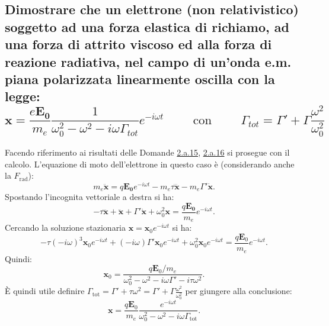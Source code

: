 \subsection[]{ Dimostrare che un elettrone (non relativistico) soggetto ad una forza elastica di richiamo, ad una forza di attrito viscoso ed alla forza di reazione radiativa, nel campo di un’onda e.m. piana polarizzata linearmente oscilla con la legge:
\[
	\boldsymbol{x} = \frac{e \boldsymbol{E_0}}{m_{e}} \frac{1}{\omega_0^2-\omega^2-i\omega\Gamma_{tot}} e^{-i \omega t} \quad \quad 
	\text{ con }  \quad \quad
	\Gamma_{tot} = \Gamma' + \Gamma \frac{\omega^2}{\omega_{0}^2}
\] 
} \label{subsec: 2.b.12}
Facendo riferimento ai risultati delle Domande \hyperref[subsec: 2.a.15]{2.a.15}, \hyperref[subsec: 2.a.16]{2.a.16}  si prosegue con il calcolo.
L'equazione di moto dell'elettrone in questo caso è (considerando anche la $F_{\text{rad}}$):
\[
m_e \ddot{\boldsymbol{x}} = q \boldsymbol{E_0}e^{-i \omega t} - m_e \tau \dddot{\boldsymbol{x}} - m_e \Gamma' \dot{\boldsymbol{x}}
.\] 
Spostando l'incognita vettoriale a destra si ha:
\[
-\tau \dddot{\boldsymbol{x}} + \ddot{\boldsymbol{x}} + \Gamma' \dot{\boldsymbol{x}} + \omega _0^2 \boldsymbol{x} = \frac{q \boldsymbol{E_0}}{m_e} e^{-i \omega t}
.\] 
Cercando la soluzione stazionaria $\boldsymbol{x} = \boldsymbol{x}_0 e^{-i \omega t}$ si ha:
\[
	-\tau \left( -i \omega \right)^3 \boldsymbol{x}_0e^{-i \omega t} + \left( - i \omega \right) \Gamma'\boldsymbol{x}_0 e^{-i \omega t} + \omega _0^2 \boldsymbol{x}_0 e^{-i \omega t} = \frac{q \boldsymbol{E}_0}{m_e} e^{-i \omega t}
.\] 
Quindi:
\[
\boldsymbol{x}_0 = \frac{q \boldsymbol{E}_0/m_e}{ \omega _0^2 - \omega ^2 -i \omega \Gamma' - i \tau \omega ^2 }
.\]
È quindi utile definire $\Gamma_{\text{tot}} = \Gamma' + \tau \omega ^2 = \Gamma' + \Gamma \frac{\omega ^2}{\omega _0^2}$ per giungere alla conclusione:
\[
\boldsymbol{x} = \frac{q \boldsymbol{E}_0}{m_e} \frac{e^{-i \omega t}}{\omega _0^2 - \omega ^2 - i \omega \Gamma_{\text{tot}}} 
.\] 

